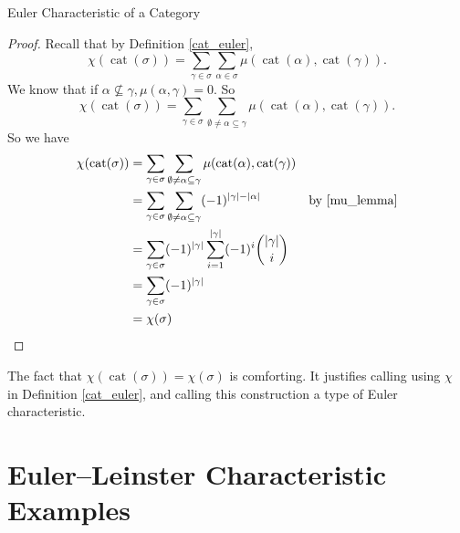 \documentclass[12pt]{pom_thesis}
\DeclareMathOperator{\cat}{cat}
\begin{document}
\begin{chapter}{Euler Characteristic of a Category}
\begin{thm}
\end{thm}
\begin{proof}
Recall that by Definition \ref{cat_euler}, 
\[
\chi(\cat(\sigma)) = \sum_{\gamma \in \sigma} \sum_{\alpha \in \sigma} \mu(\cat(\alpha), \cat(\gamma)).
\]
We know that if $\alpha \not \subseteq \gamma, \mu(\alpha, \gamma) = 0$. So
\[
\chi(\cat(\sigma)) = \sum_{\gamma \in \sigma} \sum_{\emptyset \neq \alpha \subseteq \gamma}\mu(\cat(\alpha), \cat(\gamma)).
\]
So we have
\begin{align*}
\chi(\cat(\sigma)) &= \sum_{\gamma \in \sigma} \sum_{\emptyset \neq \alpha \subseteq \gamma}\mu(\cat(\alpha), \cat(\gamma))\\
&= \sum_{\gamma \in \sigma} \sum_{\emptyset \neq \alpha \subseteq \gamma}(-1)^{|\gamma| - |\alpha|} &\text{by \ref{mu_lemma}}\\
&= \sum_{\gamma \in \sigma}(-1)^{|\gamma|} \sum_{i = 1}^{|\gamma|} (-1)^i{|\gamma| \choose i}\\
&= \sum_{\gamma \in \sigma} (-1)^{|\gamma|} \\
&= \chi(\sigma)
\end{align*}
\end{proof}
The fact that $\chi(\cat(\sigma)) = \chi(\sigma)$ is comforting. It justifies calling using $\chi$ in Definition \ref{cat_euler}, and calling this construction a type of Euler characteristic.

\section{Euler--Leinster Characteristic Examples}

\end{chapter}
\end{document}
